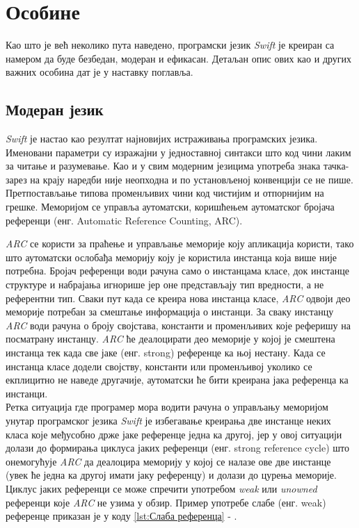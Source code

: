 \documentclass[12pt,oneside]{memoir}
\begin{document}
\section{Особине}

\indent Као што је већ неколико пута наведено, програмски језик \textit{Swift} је креиран са намером да буде безбедан, модеран и ефикасан. Детаљан опис ових као и других важних особина дат је у наставку поглавља. 

\subsection{Модеран језик}
\label{sec:Модеран}

\indent \textit{Swift} је настао као резултат најновијих истраживања програмских језика.
Именовани параметри су изражајни у једноставној синтакси што код чини лаким за читање и разумевање. Као и у свим модерним језицима употреба знака тачка-зарез на крају наредби није неопходна и по установљеној конвенцији се не пише. Претпостављање типова променљивих чини код чистијим и отпорнијим на грешке. Меморијом се управља аутоматски, коришћењем аутоматског бројача референци (енг. Automatic Reference Counting, ARC).

\indent \textit{ARC} се користи за праћење и управљање меморије коју апликација користи, тако што аутоматски ослобађа меморију коју је користила инстанца која више није потребна. Бројач референци води рачуна само о инстанцама класе, док инстанце структуре и набрајања игнорише јер оне представљају тип вредности, а не референтни тип. Сваки пут када се креира нова инстанца класе, \textit{ARC} одвоји део меморије потребан за смештање информација о инстанци. За сваку инстанцу \textit{ARC} води рачуна о броју својстава, константи и променљивих које реферишу на посматрану инстанцу. \textit{ARC} ће деалоцирати део меморије у којој је смештена инстанца тек када све јаке (енг. strong) референце ка њој нестану. Када се инстанца класе додели својству, константи или променљивој уколико се екплицитно не наведе другачије, аутоматски ће бити креирана јака референца ка инстанци. \\
\indent Ретка ситуација где програмер мора водити рачуна о управљању меморијом унутар програмског језика \textit{Swift} је избегавање креирања две инстанце неких класа које међусобно држе јаке референце једна ка другој, јер у овој ситуацији долази до формирања циклуса јаких референци (енг. strong reference cycle) што онемогућује \textit{ARC} да деалоцира меморију у којој се налазе ове две инстанце (увек ће једна ка другој имати јаку референцу) и долази до цурења меморије. Циклус јаких референци се може спречити употребом \textit{weak} или \textit{unowned} референци које \textit{ARC} не узима у обзир. Пример употребе слабе (енг. weak) референце приказан је у коду \ref{lst:Слаба референца} - .
\end{document}
